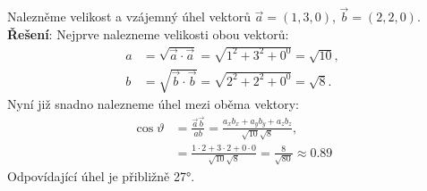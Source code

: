 \begin{mdframed}[style=mdexam]
  \begin{example}\label{fyz:exam026}
    Nalezněme velikost a vzájemný úhel vektorů \(\vec{a} = (1, 3, 0)\), \(\vec{b} = (2, 2, 0)\).
    \newline
    \textbf{Řešení}:  Nejprve nalezneme velikosti obou vektorů:
    \begin{align*}
      a &=\sqrt{\vec{a}\cdot\vec{a}} = \sqrt{1^2 + 3^2 + 0^0} = \sqrt{10}, \\
      b &=\sqrt{\vec{b}\cdot\vec{b}} = \sqrt{2^2 + 2^2 + 0^0} = \sqrt{8}.
    \end{align*}
    Nyní již snadno nalezneme úhel mezi oběma vektory: 
    \begin{align*}
      \cos\vartheta &= \frac{\vec{a}\vec{b}}{ab} 
                     = \frac{a_xb_x + a_yb_y + a_zb_z}{\sqrt{10}\sqrt{8}},            \\
                    &= \frac{1\cdot2 + 3\cdot2 + 0\cdot0}{\sqrt{10}\sqrt{8}} = \frac{8}{\sqrt{80}}
                       \approx\num{0.89} 
    \end{align*}
    Odpovídající úhel je přibližně \ang{27}.
  \end{example}
\end{mdframed}